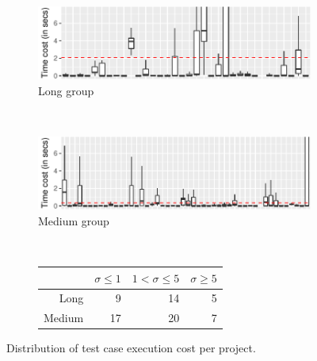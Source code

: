 \begin{figure}[ht]
    \centering

    \begin{subfigure}{0.47\textwidth}
      \centering
      \includegraphics[width=\textwidth]{plots/testcost-long.pdf}
      \caption{\label{fig:longtcost}Long group}
    \end{subfigure}\\
    \vspace{2.5ex}
    \begin{subfigure}{0.47\textwidth}
      \centering
      \includegraphics[width=\textwidth]{plots/testcost-medium.pdf}
      \caption{\label{fig:medtcost}Medium group}
    \end{subfigure}\\
    \vspace{2.5ex}
    \begin{subfigure}{0.5\textwidth}
      \centering
      \begin{tabular}{rrrr}
        \toprule
        & $\sigma\leq1$ & $1<\sigma\leq5$ & $\sigma\ge5$ \\
        \midrule    
        Long   &  9 & 14 & 5 \\
        Medium & 17 & 20 & 7 \\
        \bottomrule
      \end{tabular}
      \caption{\label{fig:sd}}    
    \end{subfigure}%

    \caption{\label{fig:time-distributions}Distribution of test case
    execution cost per project.}    
\end{figure}

